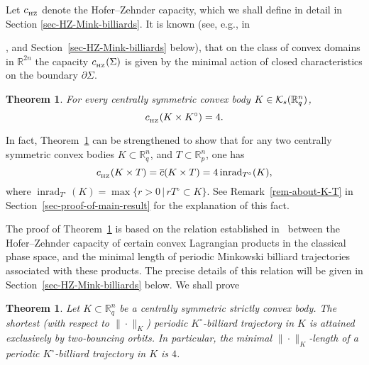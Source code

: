 \documentclass[11pt]{article}
\def\RR{\mathbb{R}}
\def\inrad{\mathop\mathrm{inrad}\nolimits}
\newtheorem{theorem}[lemma]{Theorem}
\begin{document}
Let $ c_{_{\rm HZ}}$ denote the Hofer--Zehnder capacity, which we shall define in detail in Section \ref{sec-HZ-Mink-billiards}. It is known  (see, e.g.,  in~{\cite{HZ}, and Section~\ref{sec-HZ-Mink-billiards} below), that on the class of convex domains in ${\mathbb R}^{2n}$ the capacity $c_{_{\rm HZ}}(\Sigma)$
is given by the minimal action of closed characteristics on the boundary $\partial \Sigma$.

\begin{theorem} \label{thm-about-capacities} For every centrally symmetric convex body $K \in {\cal K}_s({\mathbb R}_q^{n})$, 
$$ c_{_{\rm HZ}}(K \times K^{\circ})   =4.$$
\end{theorem}

In fact, %
Theorem~\ref{thm-about-capacities} can be strengthened to show that for any two centrally symmetric convex bodies 
$K \subset {\mathbb R}^n_q$, and $T  \subset {\mathbb R}^n_p$, one has  
\begin{equation} \label{cap-of-Lag-Prod-Symetric} c_{_{\rm HZ}}(K \times T)   =  \overline c(K \times T) =  4 \inrad_{T^{\circ}}(K), \end{equation} 
where  $\inrad_{T^{\circ}}(K) = \max \{ r> 0 \, | \, rT{^\circ} \subset K \}$. See Remark~\ref{rem-about-K-T}  %
in Section~\ref{sec-proof-of-main-result} for the explanation of this fact.

The proof of Theorem~\ref{thm-about-capacities} is based on the relation established in~\cite{AAO1} between the Hofer--Zehnder capacity of 
certain convex Lagrangian products in the classical phase space, and the minimal length of periodic Minkowski billiard trajectories associated with these products. 
The precise details of this relation will be given in Section~\ref{sec-HZ-Mink-billiards} below. We shall prove
\begin{theorem} \label{thm-about-strictly-convex-billiards}
Let $K\subset \RR_q^n$ be a centrally symmetric strictly convex body. The shortest (with respect to $\| \cdot \|_K$) periodic $K^{\circ}$-billiard trajectory in $K$ is attained exclusively by two-bouncing orbits. In particular, the minimal $\|\cdot \|_K$-length of a periodic $K^{\circ}$-billiard trajectory in $K$ is  $4$. 
\end{theorem} 



}
\end{document}
